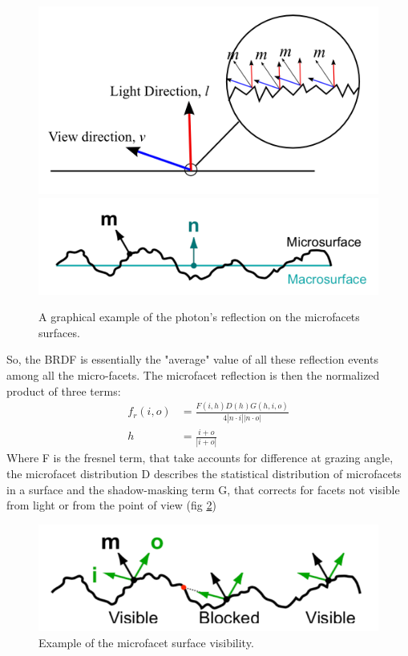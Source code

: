 \documentclass[11pt]{article}
\begin{document}
\begin{figure}[ht]
	\centering
	\includegraphics[width=0.5\linewidth]{img/microfacet}
	\includegraphics[width=0.5\linewidth]{img/microfacet2}
	\caption{A graphical example of the photon's reflection on the microfacets surfaces.}
	\label{fig:microfacet}
\end{figure}

So, the BRDF is essentially the "average" value of all these reflection events among all the micro-facets.
The microfacet reflection is then the normalized product of three terms:
\begin{align*}
	f_r(i,o)&=\frac{F(i,h)D(h)G(h,i,o)}{4|n\cdot i||n\cdot o|}\\
	h&= \frac{i+o}{|i+o|}
\end{align*}
Where F is the fresnel term, that take accounts for difference at grazing angle, the microfacet distribution D describes the statistical distribution of microfacets in a surface and the shadow-masking term G, that corrects for facets not visible from light or from the point of view (fig \ref{fig:visible})

\begin{figure}[ht]
	\centering
	\includegraphics[width=0.5\linewidth]{img/visible}
	\caption{Example of the microfacet surface visibility.}
	\label{fig:visible}
\end{figure}
\end{document}
